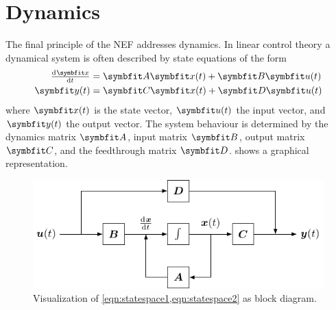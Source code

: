 \section{Dynamics}
The final principle of the NEF addresses dynamics.
In linear control theory a dynamical system is often described by state equations of the form
\begin{align}
    \od{\vc x}{t} &= \mat A \vc x(t) + \mat B \vc u(t) \label{eqn:statespace1} \\
    \vc y(t) &= \mat C \vc x(t) + \mat D \vc u(t) \label{eqn:statespace2}
\end{align}
where $\vc x(t)$ is the state vector, $\vc u(t)$ the input vector, and $\vc y(t)$ the output vector.
The system behaviour is determined by the dynamics matrix $\mat A$, input matrix $\mat B$, output matrix $\mat C$, and the feedthrough matrix $\mat D$.
 shows a graphical representation.
\begin{figure}
    \centering
    \includegraphics{tikz/statespace}
    \caption{Visualization of \cref{eqn:statespace1,eqn:statespace2} as block diagram.}\label{fig:statespace}
\end{figure}

